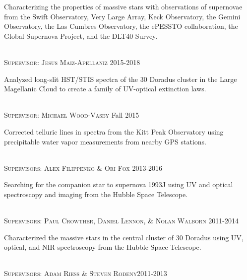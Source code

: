 \documentclass[10pt]{cv}
\begin{document}
\begin{llist}
\begin{minipage}[l]{0.7\textwidth}
Characterizing the properties of massive stars with observations of supernovae from the Swift Observatory, Very Large Array, Keck Observatory, the Gemini Observatory, the Las Cumbres Observatory, the ePESSTO collaboration, the Global Supernova Project, and the DLT40 Survey.\\
\end{minipage}
\\
\textsc{Supervisor: Jesus Maiz-Apellaniz} \hfill 2015-2018\\
\begin{minipage}[l]{0.7\textwidth}\vspace{0.15cm}
Analyzed long-slit HST/STIS spectra of the 30 Doradus cluster in 
the Large Magellanic Cloud to create a family of UV-optical extinction laws. \\
\end{minipage}
\\
\textsc{Supervisor: Michael Wood-Vasey} \hfill Fall 2015\\
\begin{minipage}[l]{0.7\textwidth}\vspace{0.15cm}
Corrected telluric lines in spectra from the Kitt Peak Observatory using
precipitable water vapor measurements from nearby GPS stations.\\
\end{minipage}
\\
\textsc{Supervisors: Alex Filippenko \& Ori Fox} \hfill 2013-2016\\
\begin{minipage}[l]{0.7\textwidth}\vspace{0.15cm}
Searching for the companion star to supernova 1993J using UV and optical 
spectroscopy and imaging from the Hubble Space Telescope.\\
\end{minipage}
\\
\textsc{Supervisors: Paul Crowther, Daniel Lennon, \& Nolan Walborn} \hfill 2011-2014\\
\begin{minipage}[l]{0.7\textwidth}\vspace{0.15cm}
Characterized the massive stars in the central cluster of 30 Doradus using 
UV, optical, and NIR spectroscopy from the Hubble Space Telescope.\\
\end{minipage}
\\
\textsc{Supervisors: Adam Riess \& Steven Rodeny}\hfill 2011-2013\\
\begin{minipage}[l]{0.7\textwidth}\vspace{0.15cm}

\end{minipage}
\end{llist}
\end{document}

